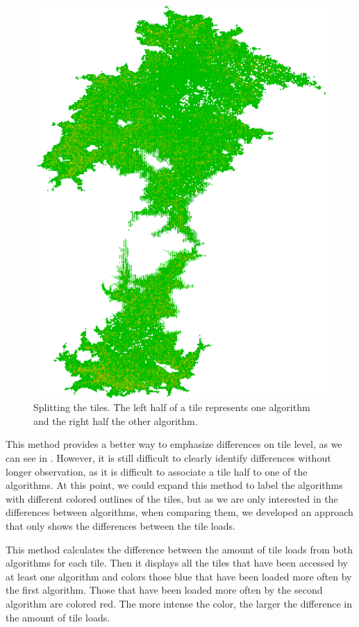 \documentclass
[
    paper = a4,
    pagesize,
    12 pt,
    twoside,                       %
    open = right,
    DIV = calc,
    BCOR = 0 mm,                   %
    bibtotoc
]
{scrbook}
\begin{document}
\begin{figure}
    \includegraphics[width=\textwidth]{Images/vis-compare-splitted.png}
\caption[]{Splitting the tiles. The left half of a tile represents one algorithm and the right half the other algorithm.}
\label{fig:splitted_tiles}
\end{figure}

This method provides a better way to emphasize differences on tile level, as we can see in .
However, it is still difficult to clearly identify differences without longer observation, as it is difficult to associate a tile half to one of the algorithms.
At this point, we could expand this method to label the algorithms with different colored outlines of the tiles, but as we are only interested in the differences between algorithms, when comparing them, we developed an approach that only shows the differences between the tile loads.

This method calculates the difference between the amount of tile loads from both algorithms for each tile.
Then it displays all the tiles that have been accessed by at least one algorithm and colors those blue that have been loaded more often by the first algorithm.
Those that have been loaded more often by the second algorithm are colored red.
The more intense the color, the larger the difference in the amount of tile loads.
\end{document}

